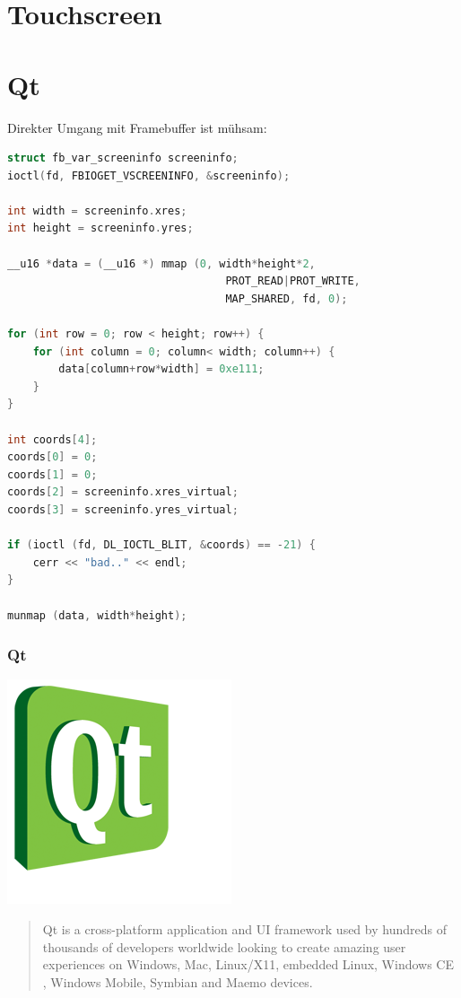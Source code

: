 \documentclass{beamer}
\begin{document}
	\section{Touchscreen}
	
	\section{Qt}
	
	\begin{frame}[containsverbatim]
		Direkter Umgang mit Framebuffer ist mühsam:
		\begin{lstlisting}[language=C, basicstyle=\scriptsize]
struct fb_var_screeninfo screeninfo;
ioctl(fd, FBIOGET_VSCREENINFO, &screeninfo);

int width = screeninfo.xres;
int height = screeninfo.yres;

__u16 *data = (__u16 *) mmap (0, width*height*2,
                                  PROT_READ|PROT_WRITE,
                                  MAP_SHARED, fd, 0);

for (int row = 0; row < height; row++) {
    for (int column = 0; column< width; column++) {
        data[column+row*width] = 0xe111;
    }
}

int coords[4];
coords[0] = 0;
coords[1] = 0;
coords[2] = screeninfo.xres_virtual;
coords[3] = screeninfo.yres_virtual;

if (ioctl (fd, DL_IOCTL_BLIT, &coords) == -21) {
    cerr << "bad.." << endl;
}

munmap (data, width*height);
		\end{lstlisting}
	\end{frame}	
	
	\begin{frame}
		\frametitle{Qt}
		\begin{floatingfigure}[l]{1.75cm}
			\includegraphics[scale=0.3]{img/qt-logo}
		\end{floatingfigure}
		\begin{quote}
		Qt is a cross-platform application  and UI framework used by hundreds of thousands of developers worldwide looking to create amazing user experiences  on Windows, Mac, Linux/X11, embedded Linux, Windows CE , Windows Mobile, Symbian  and Maemo devices.
		\end{quote}
	\end{frame}	
	
\end{document}

